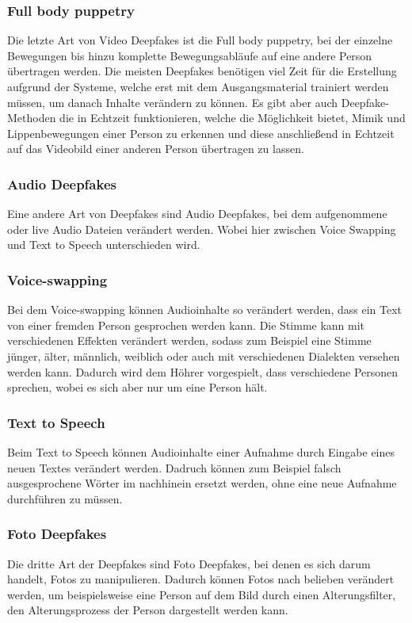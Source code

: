 \subsubsection{Full body puppetry}
Die letzte Art von Video Deepfakes ist die Full body puppetry, bei der einzelne Bewegungen bis hinzu komplette
Bewegungsabläufe auf eine andere Person übertragen werden.\newline
Die meisten Deepfakes benötigen viel Zeit für die Erstellung aufgrund der Systeme, welche erst mit dem Ausgangsmaterial trainiert werden müssen, um danach Inhalte verändern zu können.
Es gibt aber auch Deepfake-Methoden die in Echtzeit funktionieren, welche die Möglichkeit bietet, Mimik und Lippenbewegungen einer Person zu erkennen und diese anschließend in Echtzeit auf das Videobild einer anderen Person übertragen zu lassen.\cite{ResearchGate}

\subsubsection{Audio Deepfakes}
Eine andere Art von Deepfakes sind Audio Deepfakes, bei dem aufgenommene oder live Audio Dateien verändert werden. Wobei hier zwischen Voice Swapping und Text to Speech unterschieden wird.\cite{ResearchGate}

\subsubsection{Voice-swapping}
Bei dem Voice-swapping können Audioinhalte so verändert werden, dass ein Text von einer fremden Person gesprochen werden kann. Die Stimme kann mit verschiedenen Effekten verändert werden, sodass zum Beispiel eine Stimme jünger, älter, männlich, weiblich oder auch mit verschiedenen Dialekten versehen werden kann.
Dadurch wird dem Höhrer vorgespielt, dass verschiedene Personen sprechen, wobei es sich aber nur um eine Person hält.\cite{ResearchGate}

\subsubsection{Text to Speech}
Beim Text to Speech können Audioinhalte einer Aufnahme durch Eingabe eines neuen Textes verändert werden. Dadruch können zum Beispiel falsch ausgesprochene Wörter im nachhinein ersetzt werden, ohne eine neue Aufnahme durchführen zu müssen.\cite{ResearchGate}

\subsubsection{Foto Deepfakes}
Die dritte Art der Deepfakes sind Foto Deepfakes, bei denen es sich darum handelt, Fotos zu manipulieren. Dadurch können Fotos nach belieben verändert werden, um beispielsweise eine Person auf dem Bild durch einen Alterungsfilter, den Alterungsprozess der Person dargestellt werden kann.\cite{ResearchGate}

